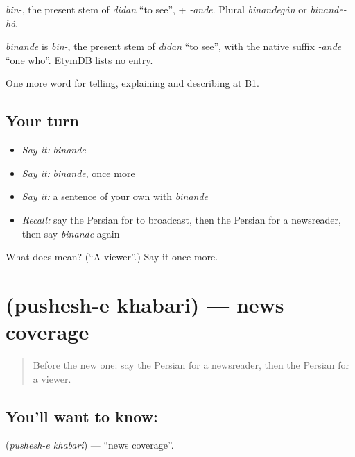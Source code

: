\emph{bin-}, the present stem of \emph{didan} \textquotedblleft{}to see\textquotedblright{}, + \emph{-ande}. Plural \emph{binandegân} or \emph{binande-hâ}.

\begin{cousinweb}
\emph{binande} is \emph{bin-}, the present stem of \emph{didan} \textquotedblleft{}to see\textquotedblright{}, with the native suffix \emph{-ande} \textquotedblleft{}one who\textquotedblright{}. EtymDB lists no entry.
\end{cousinweb}

\begin{grammarlens}[title={What you've built}]
One more word for telling, explaining and describing at B1.
\end{grammarlens}

\subsection*{Your turn}
\begin{itemize}
\raggedright
  \item \emph{Say it:} \emph{binande}
  \item \emph{Say it:} \emph{binande}, once more
  \item \emph{Say it:} a sentence of your own with \emph{binande}
  \item \emph{Recall:} say the Persian for to broadcast, then the Persian for a newsreader, then say \emph{binande} again
\end{itemize}

\begin{tcolorbox}[breakable,colback=teal!4,colframe=teal!35!black,title={Before you move on}]
What does  mean? (\textquotedblleft{}A viewer\textquotedblright{}.) Say it once more.
\end{tcolorbox}
\section[\texorpdfstring{\fa{پوشش} \fa{خبری} (pushesh-e khabari)}{پوشش خبری (pushesh-e khabari)}]{  (pushesh-e khabari) — news coverage}

\label{lesson:FA-C312-pushesh-e-khabari}



\begin{quote}
Before the new one: say the Persian for a newsreader, then the Persian for a viewer.
\end{quote}

\subsection*{You'll want to know:  }
\textbf{ } (\emph{pushesh-e khabari}) — \textquotedblleft{}news coverage\textquotedblright{}.

